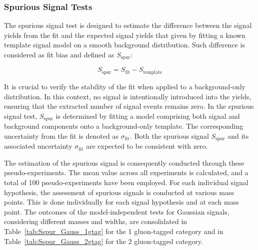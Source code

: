 \subsubsection{Spurious Signal Tests}

The spurious signal test is designed to estimate the difference between the signal yields from the fit and the expected signal yields that given by fitting a known template signal model on a smooth background distribution. Such difference is considered as fit bias and defined as $S_\mathrm{spur}$:

\begin{equation}
 S_\mathrm{spur} = S_\mathrm{fit} - S_\mathrm{template}
\end{equation}

It is crucial to verify the stability of the fit when applied to a background-only distribution. In this context, no signal is intentionally introduced into the yields, ensuring that the extracted number of signal events remains zero. In the spurious signal test, $S_\mathrm{spur}$ is determined by fitting a model comprising both signal and background components onto a background-only template. The corresponding uncertainty from the fit is denoted as $\sigma_\mathrm{fit}$. Both the spurious signal $S_\mathrm{spur}$ and its associated uncertainty $\sigma_\mathrm{fit}$ are expected to be consistent with zero.

The estimation of the spurious signal is consequently conducted through these pseudo-experiments. The mean value across all experiments is calculated, and a total of 100 pseudo-experiments have been employed. For each individual signal hypothesis, the assessment of spurious signals is conducted at various mass points. This is done individually for each signal hypothesis and at each mass point. The outcomes of the model-independent tests for Gaussian signals, considering different masses and widths, are consolidated in Table~\ref{tab:Sspur_Gauss_1gtag} for the 1 gluon-tagged category and in Table~\ref{tab:Sspur_Gauss_2gtag} for the 2 gluon-tagged category. %

